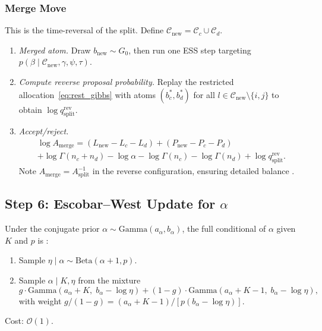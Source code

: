 \documentclass[12pt, a4paper]{article}
\theoremstyle{remark}
\begin{document}
\subsubsection{Merge Move}

This is the time-reversal of the split.
Define $\mathcal{C}_{\mathrm{new}} = \mathcal{C}_c \cup \mathcal{C}_d$.

\begin{enumerate}[leftmargin=*, itemsep=4pt]
  \item \textit{Merged atom.}
        Draw $b_{\mathrm{new}} \sim G_0$, then run one ESS step targeting
        $p(\beta \mid \mathcal{C}_{\mathrm{new}},\gamma,\psi,\tau)$.

  \item \textit{Compute reverse proposal probability.}
        Replay the restricted allocation~\eqref{eq:rest_gibbs}
        with atoms $(b_c^*, b_d^*)$ for all
        $l \in \mathcal{C}_{\mathrm{new}} \setminus \{i,j\}$
        to obtain $\log q_{\mathrm{split}}^{\mathrm{rev}}$.

  \item \textit{Accept/reject.}
        \begin{multline}
          \log A_{\mathrm{merge}}
          = (L_{\mathrm{new}} - L_c - L_d)
            + (P_{\mathrm{new}} - P_c - P_d)\\
            + \log\Gamma(n_c + n_d)
            - \log\alpha - \log\Gamma(n_c) - \log\Gamma(n_d)
            + \log q_{\mathrm{split}}^{\mathrm{rev}}.
        \label{eq:A_merge}
        \end{multline}
        Note $A_{\mathrm{merge}} = A_{\mathrm{split}}^{-1}$ in the
        reverse configuration, ensuring detailed balance
        \cite{Jain2004,Jain2007}.
\end{enumerate}

\subsection{Step 6: Escobar--West Update for \texorpdfstring{$\alpha$}{alpha}}

Under the conjugate prior $\alpha \sim \mathrm{Gamma}(a_\alpha, b_\alpha)$,
the full conditional of $\alpha$ given $K$ and $p$ is
\cite{EscobarWest1995}:
\begin{enumerate}[leftmargin=*, itemsep=2pt]
  \item Sample $\eta \mid \alpha \sim \mathrm{Beta}(\alpha+1, p)$.
  \item Sample $\alpha \mid K,\eta$ from the mixture
        \begin{equation}
          g\cdot\mathrm{Gamma}(a_\alpha + K,\; b_\alpha - \log\eta)
          + (1-g)\cdot\mathrm{Gamma}(a_\alpha + K - 1,\; b_\alpha - \log\eta),
        \label{eq:EW}
        \end{equation}
        with weight $g/(1-g) = (a_\alpha + K - 1)/[p(b_\alpha - \log\eta)]$.
\end{enumerate}
Cost: $\mathcal{O}(1)$.
\end{document}
